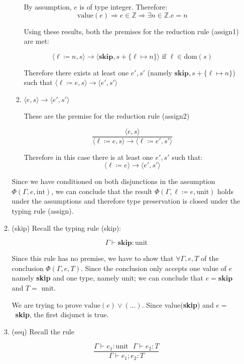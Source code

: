 \documentclass[10pt,\jkfside,a4paper]{article}
\begin{document}
\begin{enumerate}
\begin{enumerate}[label=\textbf{Case}]
\begin{enumerate}[label=\textbf{case}]
By assumption, $e$ is of type integer. Therefore:
\[
\text{value}(e) \Longrightarrow e\in \mathbb{Z} \Longrightarrow \exists n \in \mathbb{Z}. e = n
\]

Using these results, both the premises for
the reduction rule (assign1) are met:

\[
\langle \ell \coloneqq n, s \rangle \to \langle \textbf{skip}, s +
\{\ell\mapsto n\} \rangle \text{ if
 } \ell \in \text{dom}(s)
\]

Therefore there exists at least one $e', s'$ (namely $\textbf{skip}, s +
\{\ell\mapsto n\}$) such that $ \langle \ell \coloneqq e, s \rangle \to
\langle e', s' \rangle $

\item $\langle e, s \rangle \to \langle e', s' \rangle$

These are the premise for the reduction rule (assign2)

\[
\dfrac{\langle e, s \rangle }{\langle \ell \coloneqq e, s \rangle \to
\langle \ell \coloneqq e', s' \rangle}
\]

Therefore in this case there is at least one $e', s'$ such that:
\[
\langle \ell \coloneqq e \rangle \to \langle e', s' \rangle
\]

\end{enumerate}

Since we have conditioned on both disjunctions in the assumption
$\Phi(\Gamma, e, \text{int})$, we can conclude that the result $\Phi(\Gamma,
\ell \coloneqq e, \text{unit})$ holds under the assumptions and therefore
type preservation is closed under the typing rule (assign).

\item (skip) Recall the typing rule (skip):

\[
\Gamma \vdash \textbf{skip}: \text{unit}
\]

Since this rule has no premise, we have to show that $\forall \Gamma, e, T$
of the conclusion $\Phi(\Gamma, e, T)$. Since the conclusion only accepts
one value of $e$ namely \textbf{skip} and one type, namely unit; we can
conclude that $e = \textbf{skip}$ and $T =$ unit.

We are trying to prove $\text{value}(e)\vee(...)$.
Since value(\textbf{skip}) and $e =$~\textbf{skip}, the first disjunct is true.

\item (seq) Recall the rule

\[
\dfrac{\Gamma \vdash e_1: \text{unit} \ \ \ \Gamma \vdash e_2 : T}{\Gamma
\vdash e_1; e_2 : T}
\]


\end{enumerate}
\end{enumerate}
\end{document}
